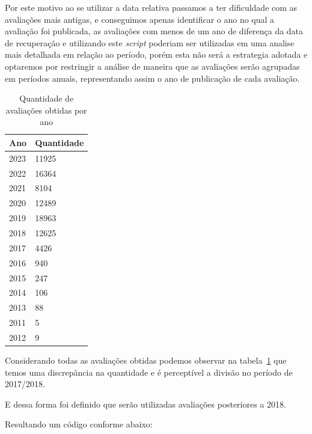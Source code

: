 Por este motivo ao se utilizar a data relativa passamos a ter dificuldade com as avaliações mais antigas, e conseguimos apenas identificar o ano no qual a avaliação foi publicada, as avaliações com menos de um ano de diferença da data de recuperação e utilizando este \textit{script} poderiam ser utilizadas em uma analise mais detalhada em relação ao período, porém esta não será a estrategia adotada e optaremos por restringir a análise de maneira que as avaliações serão agrupadas em períodos anuais, representando assim o ano de publicação de cada avaliação.

\begin{table}[]
	\centering
	\begin{tabular}{|l|l|}
		\hline
		\textbf{Ano} & \textbf{Quantidade} \\\hline
		2023         & 11925               \\
		2022         & 16364               \\
		2021         & 8104                \\
		2020         & 12489               \\
		2019         & 18963               \\
		2018         & 12625               \\
		2017         & 4426                \\
		2016         & 940                 \\
		2015         & 247                 \\
		2014         & 106                 \\
		2013         & 88                  \\
		2011         & 5                   \\
		2012         & 9                   \\
		\hline
	\end{tabular}%
	\caption{Quantidade de avaliações obtidas por ano}
	\label{table:review_per_year}
\end{table}

Considerando todas as avaliações obtidas podemos observar na tabela~\ref{table:review_per_year} que temos uma discrepância na quantidade e é perceptível a divisão no período de 2017/2018.

E dessa forma foi definido que serão utilizadas avaliações posteriores a 2018.

Resultando um código conforme abaixo:



